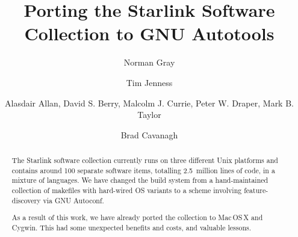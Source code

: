 \documentclass[11pt,twoside]{article}
\begin{document}

\title{Porting the Starlink Software Collection to GNU Autotools}
\marginpar{[v\RCSRevision]}

\author{Norman Gray}
\author{Tim Jenness}
\author{Alasdair Allan,
    David S. Berry,
    Malcolm J. Currie,
    Peter W. Draper,
    Mark B. Taylor}
\author{Brad Cavanagh}




%



\begin{abstract}
The Starlink software collection currently runs on three different
Unix platforms and contains around 100 separate software items,
totalling 2.5~million lines of code, in a mixture of languages.  We
have changed the build system from a hand-maintained collection of
makefiles with hard-wired OS variants to a scheme involving
feature-discovery via GNU Autoconf.

As a result of this work, we have already ported the collection to
Mac\,OS\,X and Cygwin.  This had some unexpected benefits and costs, and
valuable lessons.
\end{abstract}
\end{document}
